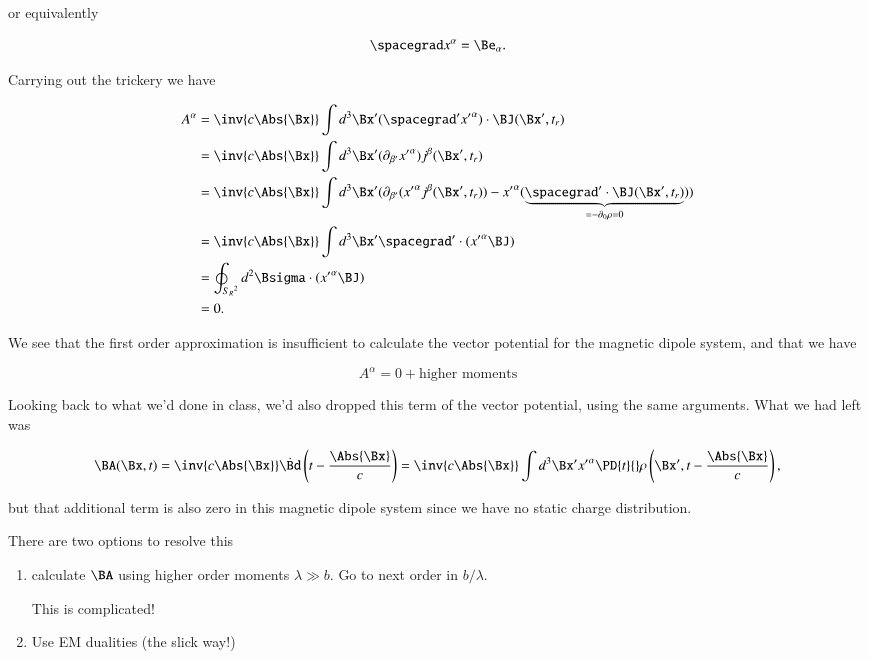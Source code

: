 or equivalently

\begin{equation}\label{eqn:relativisticElectrodynamicsT8:135}
\spacegrad x^\alpha = \Be_\alpha.
\end{equation}

Carrying out the trickery we have

\begin{align*}
A^\alpha 
&= \inv{c\Abs{\Bx}} \int d^3 \Bx' ( \spacegrad' {x'}^\alpha ) \cdot \BJ(\Bx', t_r) \\
&= \inv{c\Abs{\Bx}} \int d^3 \Bx' ( \partial_{\beta'} {x'}^\alpha ) j^\beta (\Bx', t_r) \\
&= \inv{c\Abs{\Bx}} \int d^3 \Bx' ( \partial_{\beta'} ({x'}^\alpha j^\beta(\Bx', t_r)) - {x'}^\alpha (\underbrace{\spacegrad' \cdot \BJ(\Bx', t_r)}_{=-\partial_0 \rho = 0}) ) \\
&= \inv{c\Abs{\Bx}} \int d^3 \Bx' \spacegrad' \cdot ({x'}^\alpha \BJ) \\
&= \oint_{{S_R}^2} d^2 \Bsigma \cdot ({x'}^\alpha \BJ) \\
&= 0.
\end{align*}

We see that the first order approximation is insufficient to calculate the vector potential for the magnetic dipole system, and that we have

\begin{equation}\label{eqn:relativisticElectrodynamicsT8:170}
A^\alpha = 0 + \text{higher moments}
\end{equation}

Looking back to what we'd done in class, we'd also dropped this term of the vector potential, using the same arguments.  What we had left was

\begin{equation}\label{eqn:relativisticElectrodynamicsT8:171}
\BA(\Bx, t) = \inv{c \Abs{\Bx} } \dot{\Bd}\left(t - \frac{\Abs{\Bx} }{c}\right)
= \inv{ c \Abs{\Bx} } \int d^3 \Bx' {x'}^\alpha \PD{t}{}\rho\left(\Bx', t - \frac{\Abs{\Bx} }{c}\right),
\end{equation}

but that additional term is also zero in this magnetic dipole system since we have no static charge distribution.

There are two options to resolve this

\begin{enumerate}
\item calculate $\BA$ using higher order moments $\lambda \gg b$.  Go to next order in $b/\lambda$.

This is complicated!

\item Use EM dualities (the slick way!)
\end{enumerate}

